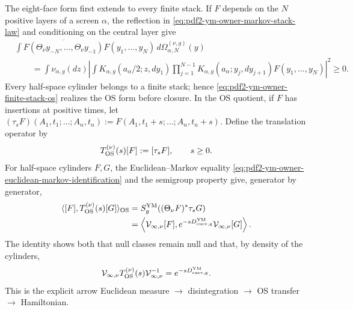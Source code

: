 The eight-face form first extends to every finite stack. If $F$ depends on
the $N$ positive layers of a screen $\alpha$, the reflection in
\eqref{eq:pdf2-ym-owner-markov-stack-law} and conditioning on the central layer give
\begin{equation}\label{eq:pdf2-ym-owner-finite-stack-os}
 \begin{aligned}
 &\int \overline{F(\Theta_\nu y_{-N},\ldots,
                         \Theta_\nu y_{-1})}
          F(y_1,\ldots,y_N)\,d\Omega_{\alpha,N}^{(\nu,g)}(y)\\
 &\qquad=
 \int\nu_{\alpha,g}(dz)\left|
  \int K_{\alpha,g}(a_\alpha/2;z,dy_1)
       \prod_{j=1}^{N-1}K_{\alpha,g}(a_\alpha;y_j,dy_{j+1})
       F(y_1,\ldots,y_N)
 \right|^2\ge0.
 \end{aligned}
\end{equation}
Every half-space cylinder belongs to a finite stack; hence
\eqref{eq:pdf2-ym-owner-finite-stack-os} realizes the OS form before
closure. In the OS quotient, if $F$ has insertions at positive times, let
$(\tau_sF)(A_1,t_1;\ldots;A_n,t_n):=
F(A_1,t_1+s;\ldots;A_n,t_n+s)$. Define the translation operator by
\begin{equation}\label{eq:pdf2-ym-owner-os-transfer-operator}
 T_{\rm OS}^{(\nu)}(s)[F]:=[\tau_sF],
 \qquad s\ge0.
\end{equation}
For half-space cylinders $F,G$, the Euclidean--Markov equality
\eqref{eq:pdf2-ym-owner-euclidean-markov-identification} and the semigroup
property give, generator by generator,
\begin{equation}\label{eq:pdf2-ym-owner-os-markov-intertwining}
 \begin{aligned}
 \langle[F],T_{\rm OS}^{(\nu)}(s)[G]\rangle_{\rm OS}
 &=S_g^{\rm YM}((\Theta_\nu F)^*\tau_sG)\\
 &=\left\langle
    \mathcal V_{\infty,\nu}[F],
    e^{-sD_{\rm curv,g}^{\rm YM}}
    \mathcal V_{\infty,\nu}[G]
   \right\rangle .
 \end{aligned}
\end{equation}
The identity shows both that null classes remain null and that,
by density of the cylinders,
\begin{equation}\label{eq:pdf2-ym-owner-os-generator-identification}
 \mathcal V_{\infty,\nu}T_{\rm OS}^{(\nu)}(s)
 \mathcal V_{\infty,\nu}^{-1}
 =e^{-sD_{\rm curv,g}^{\rm YM}}.
\end{equation}
This is the explicit arrow Euclidean measure $\to$ disintegration $\to$
OS transfer $\to$ Hamiltonian.

